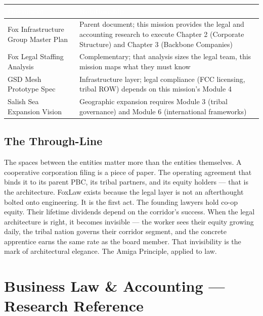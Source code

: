 \documentclass[11pt,letterpaper]{article}
\newcommand{\stageheader}[2]{%
  \noindent\colorbox{#2}{\makebox[\textwidth][l]{%
    \textcolor{white}{\bfseries\sffamily\hspace{6pt}#1\hspace{6pt}}}}%
  \vspace{0.5em}\par%
}
\newcommand{\tableheader}[1]{\textbf{\sffamily\textcolor{white}{#1}}}
\begin{document}
\begin{center}
\begin{tabularx}{\textwidth}{L{4cm}X}
\toprule
{}
\tableheader{Document} & \tableheader{Relationship} \\
\midrule
Fox Infrastructure Group Master Plan & Parent document; this mission provides the legal and accounting research to execute Chapter 2 (Corporate Structure) and Chapter 3 (Backbone Companies) \\
Fox Legal Staffing Analysis & Complementary; that analysis sizes the legal team, this mission maps what they must know \\
GSD Mesh Prototype Spec & Infrastructure layer; legal compliance (FCC licensing, tribal ROW) depends on this mission's Module 4 \\
Salish Sea Expansion Vision & Geographic expansion requires Module 3 (tribal governance) and Module 6 (international frameworks) \\
\bottomrule
\end{tabularx}
\end{center}

\subsection{The Through-Line}

The spaces between the entities matter more than the entities themselves. A cooperative corporation filing is a piece of paper. The operating agreement that binds it to its parent PBC, its tribal partners, and its equity holders --- that is the architecture. FoxLaw exists because the legal layer is not an afterthought bolted onto engineering. It is the first act. The founding lawyers hold co-op equity. Their lifetime dividends depend on the corridor's success. When the legal architecture is right, it becomes invisible --- the worker sees their equity growing daily, the tribal nation governs their corridor segment, and the concrete apprentice earns the same rate as the board member. That invisibility is the mark of architectural elegance. The Amiga Principle, applied to law.

\newpage

\stageheader{STAGE 2 --- RESEARCH REFERENCE}{secondary}

\section{Business Law \& Accounting --- Research Reference}
\end{document}
